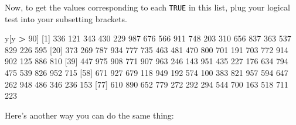 \documentclass[
]{book}
\newenvironment{Shaded}{\begin{snugshade}}{\end{snugshade}}
\newcommand{\DecValTok}[1]{\textcolor[rgb]{0.00,0.00,0.81}{#1}}
\newcommand{\NormalTok}[1]{#1}
\newcommand{\SpecialCharTok}[1]{\textcolor[rgb]{0.81,0.36,0.00}{\textbf{#1}}}
\begin{document}
Now, to get the values corresponding to each \texttt{TRUE} in this list, plug your logical test into your subsetting brackets.

\begin{Shaded}
\begin{Highlighting}[]
\NormalTok{y[y }\SpecialCharTok{\textgreater{}} \DecValTok{90}\NormalTok{]}
\NormalTok{ [}\DecValTok{1}\NormalTok{] }\DecValTok{336} \DecValTok{121} \DecValTok{343} \DecValTok{430} \DecValTok{229} \DecValTok{987} \DecValTok{676} \DecValTok{566} \DecValTok{911} \DecValTok{748} \DecValTok{203} \DecValTok{310} \DecValTok{656} \DecValTok{837} \DecValTok{363} \DecValTok{537} \DecValTok{829} \DecValTok{226} \DecValTok{595}
\NormalTok{[}\DecValTok{20}\NormalTok{] }\DecValTok{373} \DecValTok{269} \DecValTok{787} \DecValTok{934} \DecValTok{777} \DecValTok{735} \DecValTok{463} \DecValTok{481} \DecValTok{470} \DecValTok{800} \DecValTok{701} \DecValTok{191} \DecValTok{703} \DecValTok{772} \DecValTok{914} \DecValTok{902} \DecValTok{125} \DecValTok{886} \DecValTok{810}
\NormalTok{[}\DecValTok{39}\NormalTok{] }\DecValTok{447} \DecValTok{975} \DecValTok{908} \DecValTok{771} \DecValTok{907} \DecValTok{963} \DecValTok{246} \DecValTok{143} \DecValTok{951} \DecValTok{435} \DecValTok{227} \DecValTok{176} \DecValTok{634} \DecValTok{794} \DecValTok{475} \DecValTok{539} \DecValTok{826} \DecValTok{952} \DecValTok{715}
\NormalTok{[}\DecValTok{58}\NormalTok{] }\DecValTok{671} \DecValTok{927} \DecValTok{679} \DecValTok{118} \DecValTok{949} \DecValTok{192} \DecValTok{574} \DecValTok{100} \DecValTok{383} \DecValTok{821} \DecValTok{957} \DecValTok{594} \DecValTok{647} \DecValTok{262} \DecValTok{948} \DecValTok{486} \DecValTok{346} \DecValTok{236} \DecValTok{153}
\NormalTok{[}\DecValTok{77}\NormalTok{] }\DecValTok{610} \DecValTok{890} \DecValTok{652} \DecValTok{779} \DecValTok{272} \DecValTok{292} \DecValTok{294} \DecValTok{544} \DecValTok{700} \DecValTok{163} \DecValTok{518} \DecValTok{711} \DecValTok{223}
\end{Highlighting}
\end{Shaded}

Here's another way you can do the same thing:
\end{document}
